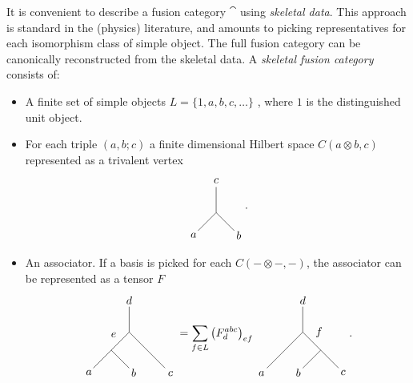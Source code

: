 \begin{definition}
	It is convenient to describe a fusion category $\cat$ using \emph{skeletal data}. This approach is standard in the (physics) literature, and amounts to picking representatives for each isomorphism class of simple object. The full fusion category can be canonically reconstructed from the skeletal data\cite{BBJSkeletal}. A \emph{skeletal fusion category} consists of:
	\begin{itemize}
		\item A finite set of simple objects $L=\{1,a,b,c,\ldots\}$ , where $1$ is the distinguished unit object.
		\item For each triple $(a,b;c)$ a finite dimensional Hilbert space $C(a\otimes b,c)$ represented as a trivalent vertex
		\begin{equation}
		\begin{tikzpicture}[scale=0.8,baseline=(current bounding box.center)]
		\draw (-.707,-.707)--(0,0) node[pos=-.25] {$a$};
		\draw (.707,-.707)--(0,0) node[pos=-.25] {$b$};
		\draw (0,0)--(0,1) node[pos=1.25] {$c$};
		\end{tikzpicture}.
		\end{equation} 
		\item An associator. If a basis is picked for each $C(-\otimes -,-)$, the associator can be represented as a tensor $F$
		\begin{equation}
		\begin{tikzpicture}[scale=0.8,baseline=(current bounding box.center)]
		\draw (0,0)--(0,1) node[pos=1.25] {$d$};
		\draw (0,0)--(1.41,-1.41) node[pos=1.15] {$c$};
		\draw (0,0)--(-.707,-.707) node [pos=.5,above left] {$e$};
		\draw (-.707,-.707)--(-1.41,-1.41)node[pos=1.25] {$a$};
		\draw (-.707,-.707)--(0,-1.41)node[pos=1.25] {$b$};
		\end{tikzpicture}
		=\sum_{f\in L}\left(F^{abc}_{d}\right)_{ef}
		\begin{tikzpicture}[scale=0.8,baseline=(current bounding box.center)]
		\draw (0,0)--(0,1) node[pos=1.25] {$d$};
		\draw (.707,-.707)--(1.41,-1.41) node[pos=1.25] {$c$};
		\draw (0,0)--(.707,-.707) node [pos=.5,above right] {$f$};
		\draw (0,0)--(-1.41,-1.41)node[pos=1.15] {$a$};
		\draw (.707,-.707)--(0,-1.41)node[pos=1.25] {$b$};
		\end{tikzpicture}.
		\end{equation} 
	\end{itemize}
\end{definition}